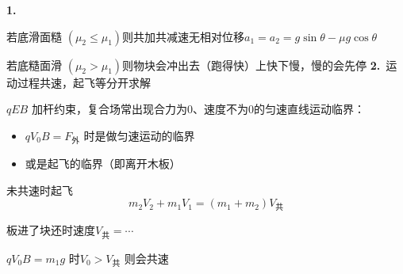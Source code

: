 \textbf{1.}

若底滑面糙 $(\mu_2\le\mu_1)$\quad 则共加共减速\quad 无相对位移\quad $a_1=a_2=g\sin\theta-\mu g\cos\theta$ %

若底糙面滑 $(\mu_2>\mu_1)$\quad 则物块会冲出去（跑得快）\quad 上快下慢，慢的会先停
\textbf{2.}\ 运动过程共速，起飞等分开求解

$qEB$ 加杆约束，复合场常出现合力为0、速度不为0的匀速直线运动临界：
\begin{itemize}
\item $qV_0B=F_{\text{外}}$ 时是做匀速运动的临界
\item 或是起飞的临界（即离开木板）
\end{itemize}


未共速时起飞
\[
m_2V_2+m_1V_1=(m_1+m_2)V_{\text{共}}
\]

板进了块还时速度\quad $V_{\text{共}}=\cdots$

$qV_0B=m_1g$ 时\quad $V_0>V_{\text{共}}$ 则会共速

